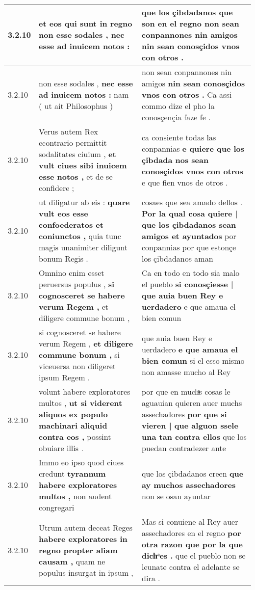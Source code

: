 \begin{tabular}{|p{1cm}|p{6.5cm}|p{6.5cm}|}
3.2.10 & et eos qui sunt in regno \textbf{ non esse sodales , } nec esse ad inuicem notos : & que los çibdadanos que son en el regno \textbf{ non sean conpannones nin amigos } nin sean conosçidos vnos con otros . \\\hline
3.2.10 & non esse sodales , \textbf{ nec esse ad inuicem notos : } nam ( ut ait Philosophus ) & non sean conpannones nin amigos \textbf{ nin sean conosçidos vnos con otros . } Ca assi commo dize el pho la conosçençia faze fe . \\\hline
3.2.10 & Verus autem Rex econtrario permittit sodalitates ciuium , \textbf{ et vult ciues sibi inuicem esse notos , } et de se confidere ; & ca consiente todas las conpannias \textbf{ e quiere que los çibdada nos sean conosçidos vnos con otros } e que fien vnos de otros . \\\hline
3.2.10 & ut diligatur ab eis : \textbf{ quare vult eos esse confoederatos et coniunctos , } quia tunc magis unanimiter diligunt bonum Regis . & cosaes que sea amado dellos . \textbf{ Por la qual cosa quiere | que los çibdadanos sean amigos et ayuntados } por conpannias por que estonçe los çibdadanos aman \\\hline
3.2.10 & Omnino enim esset peruersus populus , \textbf{ si cognosceret se habere verum Regem , } et diligere commune bonum , & Ca en todo en todo sia malo el pueblo \textbf{ si conosçiesse | que auia buen Rey e uerdadero } e que amaua el bien comun \\\hline
3.2.10 & si cognosceret se habere verum Regem , \textbf{ et diligere commune bonum , } si viceuersa non diligeret ipsum Regem . & que auia buen Rey e uerdadero \textbf{ e que amaua el bien comun } si el esso mismo non amasse mucho al Rey \\\hline
3.2.10 & volunt habere exploratores multos , \textbf{ ut si viderent aliquos ex populo machinari aliquid contra eos , } possint obuiare illis . & por que en muchͣs cosas le aguauian quieren auer muchs assechadores \textbf{ por que si vieren | que alguon ssele una tan contra ellos } que los puedan contradezer ante \\\hline
3.2.10 & Immo eo ipso quod ciues credunt \textbf{ tyrannum habere exploratores multos , } non audent congregari & que los çibdadanos creen \textbf{ que ay muchos assechadores } non se osan ayuntar \\\hline
3.2.10 & Utrum autem deceat Reges \textbf{ habere exploratores in regno propter aliam causam , } quam ne populus insurgat in ipsum , & Mas si conuiene al Rey auer assechadores en el regno \textbf{ por otra razon que por la que dichͣes . } que el pueblo non se leunate contra el adelante se dira . \\\hline

\end{tabular}
